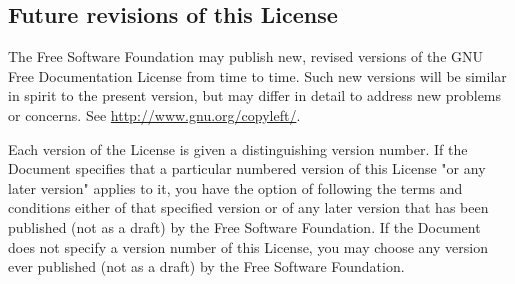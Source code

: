 	\subsection{Future revisions of this License}

	The Free Software Foundation may publish new, revised versions of the GNU Free Documentation License from time to time. Such new versions will be similar in spirit to the present version, but may differ in detail to address new problems or concerns. See \href{http://www.gnu.org/copyleft/}{{\color{blue} http://www.gnu.org/copyleft/}}. 

	Each version of the License is given a distinguishing version number. If the Document specifies that a particular numbered version of this License "or any later version" applies to it, you have the option of following the terms and conditions either of that specified version or of any later version that has been published (not as a draft) by the Free Software Foundation. If the Document does not specify a version number of this License, you may choose any version ever published (not as a draft) by the Free Software Foundation. 
	
	\begin{center}
	\end{center}
	
	\newpage
	\thispagestyle{empty}
	\mbox{}
